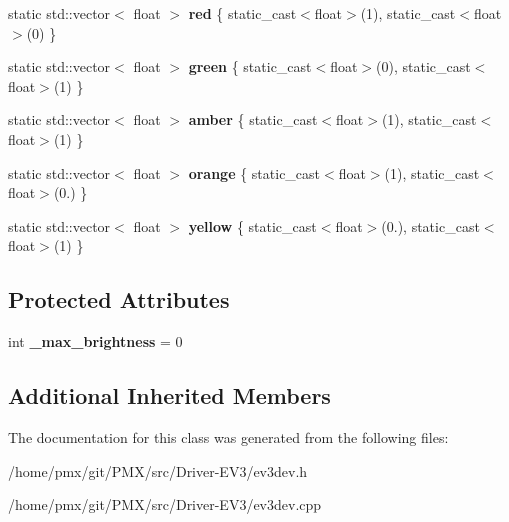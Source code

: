 \begin{DoxyCompactItemize}
static std\+::vector$<$ float $>$ {\bfseries red} \{ static\+\_\+cast$<$float$>$(1), static\+\_\+cast$<$float$>$(0) \}
\item 
\mbox{\label{classev3dev_1_1led_a7066a329510b642ba45e5bc694f83a21}} 
static std\+::vector$<$ float $>$ {\bfseries green} \{ static\+\_\+cast$<$float$>$(0), static\+\_\+cast$<$float$>$(1) \}
\item 
\mbox{\label{classev3dev_1_1led_afb35d33163e98ad4df75a2646f695659}} 
static std\+::vector$<$ float $>$ {\bfseries amber} \{ static\+\_\+cast$<$float$>$(1), static\+\_\+cast$<$float$>$(1) \}
\item 
\mbox{\label{classev3dev_1_1led_af9081f3536ca63315c5bdfc439af32f5}} 
static std\+::vector$<$ float $>$ {\bfseries orange} \{ static\+\_\+cast$<$float$>$(1), static\+\_\+cast$<$float$>$(0.) \}
\item 
\mbox{\label{classev3dev_1_1led_a761a228d93482b7d4531f5e9c16eecce}} 
static std\+::vector$<$ float $>$ {\bfseries yellow} \{ static\+\_\+cast$<$float$>$(0.), static\+\_\+cast$<$float$>$(1) \}
\end{DoxyCompactItemize}
\subsection*{Protected Attributes}
\begin{DoxyCompactItemize}
\item 
\mbox{\label{classev3dev_1_1led_a0e81bc22e8dbf6d1b0f577514802ef18}} 
int {\bfseries \+\_\+max\+\_\+brightness} = 0
\end{DoxyCompactItemize}
\subsection*{Additional Inherited Members}


The documentation for this class was generated from the following files\+:\begin{DoxyCompactItemize}
\item 
/home/pmx/git/\+P\+M\+X/src/\+Driver-\/\+E\+V3/ev3dev.\+h\item 
/home/pmx/git/\+P\+M\+X/src/\+Driver-\/\+E\+V3/ev3dev.\+cpp\end{DoxyCompactItemize}
